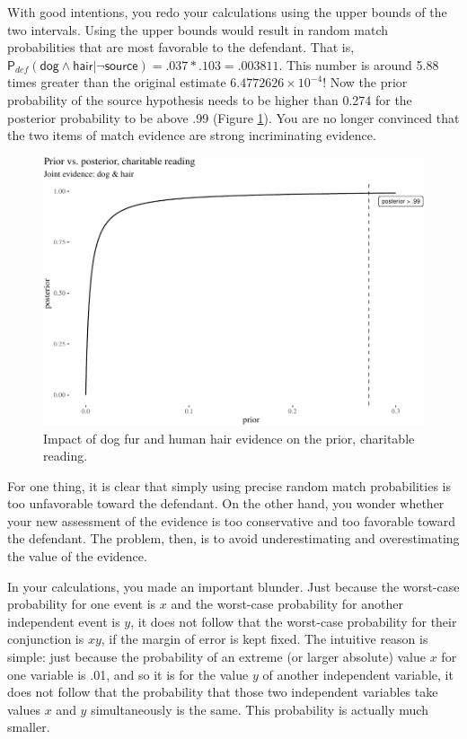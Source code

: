 \documentclass[
  10pt,
  dvipsnames,enabledeprecatedfontcommands]{scrartcl}
\newcommand{\s}[1]{\mbox{$\mathsf{#1}$}}
\begin{document}
With good intentions, you redo your calculations using the upper bounds
of the two intervals. Using the upper bounds would result in random
match probabilities that are most favorable to the defendant. That is,
\(\mathsf{P}_{def}(\s{dog}\wedge \s{hair} \vert \neg \s{source}) = .037 * .103 =.003811\).
This number is around 5.88 times greater than the original estimate
\ensuremath{6.4772626\times 10^{-4}}! Now the prior probability of the
source hypothesis needs to be higher than 0.274 for the posterior
probability to be above .99 (Figure \ref{fig:impactOfCharitable}). You
are no longer convinced that the two items of match evidence are strong
incriminating evidence.

\begin{figure}[H]

\begin{center}\includegraphics[width=0.8\linewidth]{chapter-outline_files/figure-latex/fig:charitableImpact7-1} \end{center}
\caption{Impact of dog fur and human hair evidence on the prior, charitable reading.}
\label{fig:impactOfCharitable}
\end{figure}

For one thing, it is clear that simply using precise random match
probabilities is too unfavorable toward the defendant. On the other
hand, you wonder whether your new assessment of the evidence is too
conservative and too favorable toward the defendant. The problem, then,
is to avoid underestimating and overestimating the value of the
evidence.

In your calculations, you made an important blunder. Just because the
worst-case probability for one event is \(x\) and the worst-case
probability for another independent event is \(y\), it does not follow
that the worst-case probability for their conjunction is \(xy\), if the
margin of error is kept fixed. The intuitive reason is simple: just
because the probability of an extreme (or larger absolute) value \(x\)
for one variable is .01, and so it is for the value \(y\) of another
independent variable, it does not follow that the probability that those
two independent variables take values \(x\) and \(y\) simultaneously is
the same. This probability is actually much smaller.
\end{document}
